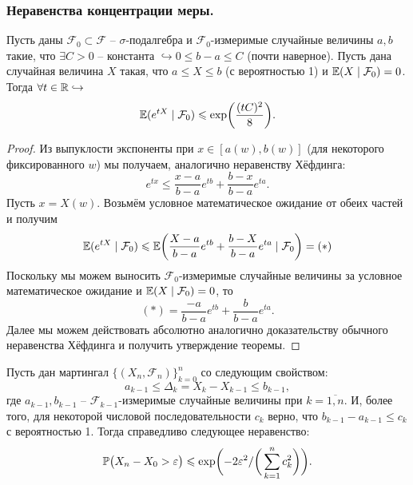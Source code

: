 \subsubsection{Неравенства концентрации меры.}
\begin{lemma}
    Пусть даны $\mathcal{F}_0 \subset \mathcal{F}$ -- $\sigma$-подалгебра и $\mathcal{F}_0$-измеримые случайные величины $a, b$ такие, что $\exists C > 0$ -- константа $\hookrightarrow 0 \leq b - a \leq C$ (почти наверное). Пусть дана случайная величина $X$ такая, что $a \leq X \leq b$ (с вероятностью 1) и $\Ex(X \mid \mathcal{F}_0) = 0$. Тогда $\forall t \in \R \hookrightarrow$
    \[
        \Ex(e^{tX}\mid \mathcal{F}_0) \leq \exp\biggr({\frac{(tC)^2}{8}}\biggr).
    \]
\end{lemma}
\begin{proof}
    Из выпуклости экспоненты при $x \in [a(w), b(w)]$ (для некоторого фиксированного $w$) мы получаем, аналогично неравенству Хёфдинга:
    \[
        e^{tx} \leq \dfrac{x - a}{b - a}e^{tb} + \frac{b- x}{b - a}e^{ta}.
    \]
    Пусть $x = X(w)$. Возьмём условное математическое ожидание от обеих частей и получим 
    \[
        \Ex(e^{tX}\mid \mathcal{F}_0) \leq \Ex\biggr(\dfrac{X - a}{b - a}e^{tb} + \dfrac{b - X}{b - a}e^{ta}\mid \mathcal{F}_0\biggr) = (*)
    \]
    Поскольку мы можем выносить $\mathcal{F}_0$-измеримые случайные величины за условное математическое ожидание и $\Ex(X \mid \mathcal{F}_0)=  0$, то 
    \[
        (*) = \frac{-a}{b - a}e^{tb} + \frac{b}{b - a}e^{ta}.
    \]
    Далее мы можем действовать абсолютно аналогично доказательству обычного неравенства Хёфдинга и получить утверждение теоремы.
\end{proof}
\begin{theorem}
    Пусть дан мартингал $\{(X_n, \mathcal{F}_n)\}_{k = 0}^n$ со следующим свойством:
    \[
        a_{k - 1} \leq \Delta_k = X_k - X_{k - 1} \leq b_{k - 1},
    \]
    где $a_{k - 1}, b_{k - 1}$ -- $\mathcal{F}_{k - 1}$-измеримые случайные величины при $k = \overline{1, n}$. И, более того, для некоторой числовой последовательности $c_k$ верно, что $b_{k - 1} - a_{k - 1} \leq c_k$ с вероятностью 1. Тогда справедливо следующее неравенство:
    \[
        \P\bigr(X_n - X_0 > \epsilon\bigr) \leq \exp\biggr({-2\epsilon^2/\biggr(\sum_{k = 1}^n c_k^2\biggr)}\biggr).
    \]
\end{theorem}
